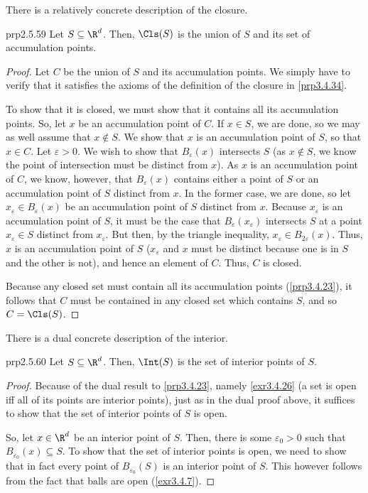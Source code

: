 There is a relatively concrete description of the closure.
\begin{prp}{}{prp2.5.59}
Let $S\subseteq \R ^d$.  Then, $\Cls (S)$ is the union of $S$ and its set of accumulation points.
\begin{proof}
Let $C$ be the union of $S$ and its accumulation points.  We simply have to verify that it satisfies the axioms of the definition of the closure in \cref{prp3.4.34}.

To show that it is closed, we must show that it contains all its accumulation points.  So, let $x$ be an accumulation point of $C$.  If $x\in S$, we are done, so we may as well assume that $x\notin S$.  We show that $x$ is an accumulation point of $S$, so that $x\in C$.  Let $\varepsilon >0$.  We wish to show that $B_\varepsilon (x)$ intersects $S$ (as $x\notin S$, we know the point of intersection must be distinct from $x$).  As $x$ is an accumulation point of $C$, we know, however, that $B_\varepsilon (x)$ contains either a point of $S$ or an accumulation point of $S$ distinct from $x$.  In the former case, we are done, so let $x_\varepsilon \in B_\varepsilon (x)$ be an accumulation point of $S$ distinct from $x$.  Because $x_\varepsilon$ is an accumulation point of $S$, it must be the case that $B_\varepsilon (x_\varepsilon )$ intersects $S$ at a point $x_\varepsilon \in S$ distinct from $x_\varepsilon$.  But then, by the triangle inequality, $x_\varepsilon \in B_{2\varepsilon}(x)$.  Thus, $x$ is an accumulation point of $S$ ($x_\varepsilon$ and $x$ must be distinct because one is in $S$ and the other is not), and hence an element of $C$.  Thus, $C$ is closed.

Because any closed set must contain all its accumulation points (\cref{prp3.4.23}), it follows that $C$ must be contained in any closed set which contains $S$, and so $C=\Cls (S)$.
\end{proof}
\end{prp}
There is a dual concrete description of the interior.
\begin{prp}{}{prp2.5.60}
Let $S\subseteq \R ^d$.  Then, $\Int (S)$ is the set of interior points of $S$.
\begin{proof}
Because of the dual result to \cref{prp3.4.23}, namely \cref{exr3.4.26} (a set is open iff all of its points are interior points), just as in the dual proof above, it suffices to show that the set of interior points of $S$ is open.

So, let $x\in \R ^d$ be an interior point of $S$.  Then, there is some $\varepsilon _0>0$ such that $B_{\varepsilon _0}(x)\subseteq S$.  To show that the set of interior points is open, we need to show that in fact every point of $B_{\varepsilon _0}(S)$ is an interior point of $S$.  This however follows from the fact that balls are open (\cref{exr3.4.7}).
\end{proof}
\end{prp}

